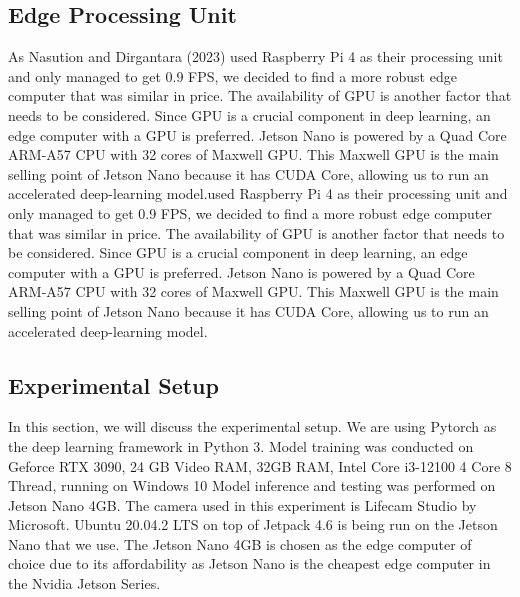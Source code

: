 \documentclass[conference]{IEEEtran}
\begin{document}
\subsection{Edge Processing Unit}
As Nasution and Dirgantara (2023) used Raspberry Pi 4 as their processing unit and only managed to get 0.9 FPS, we decided to find a more robust edge computer that was similar in price. The availability of GPU is another factor that needs to be considered. Since GPU is a crucial component in deep learning, an edge computer with a GPU is preferred. Jetson Nano is powered by a Quad Core ARM-A57 CPU with 32 cores of Maxwell GPU. This Maxwell GPU is the main selling point of Jetson Nano because it has CUDA Core, allowing us to run an accelerated deep-learning model.used Raspberry Pi 4 as their processing unit and only managed to get 0.9 FPS, we decided to find a more robust edge computer that was similar in price. The availability of GPU is another factor that needs to be considered. Since GPU is a crucial component in deep learning, an edge computer with a GPU is preferred. Jetson Nano is powered by a Quad Core ARM-A57 CPU with 32 cores of Maxwell GPU. This Maxwell GPU is the main selling point of Jetson Nano because it has CUDA Core, allowing us to run an accelerated deep-learning model.

\subsection{Experimental Setup}
In this section, we will discuss  the experimental setup. We are using Pytorch as the deep learning framework in Python  3.
Model training was conducted on Geforce RTX 3090, 24 GB Video RAM, 32GB RAM, Intel Core i3-12100 4 Core 8 Thread, running on Windows 10
Model inference and testing was performed on Jetson Nano 4GB. The camera used in this experiment is Lifecam Studio by Microsoft.
Ubuntu 20.04.2 LTS on top of Jetpack 4.6 is being run on the Jetson Nano that we use. The Jetson Nano 4GB is chosen as the edge computer of choice due to its affordability as Jetson Nano is the cheapest edge computer in the Nvidia Jetson Series.
\end{document}
